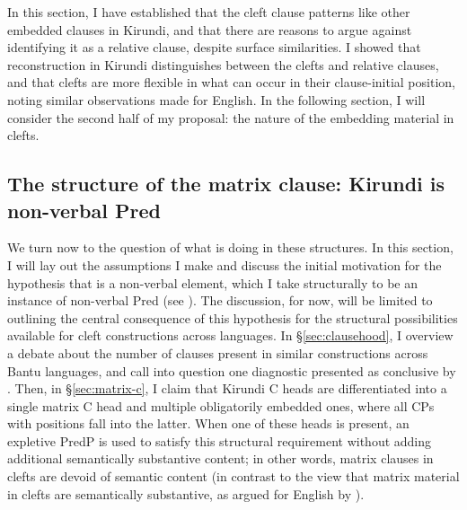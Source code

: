 \documentclass[12pt]{article}
\begin{document}
In this section, I have established that the cleft clause patterns like other embedded clauses in Kirundi, and that there are reasons to argue against identifying it as a relative clause, despite surface similarities. I showed that reconstruction in Kirundi distinguishes between the clefts and relative clauses, and that clefts are more flexible in what can occur in their clause-initial position, noting similar observations made for English. In the following section, I will consider the second half of my proposal: the nature of the embedding material in clefts. 


\subsection{The structure of the matrix clause: Kirundi  is non-verbal Pred} \label{sec:ni-is-pred}

We turn now to the question of what  is doing in these structures. In this section, I will lay out the assumptions I make and discuss the initial motivation for the hypothesis that  is a non-verbal element, which I take structurally to be an instance of non-verbal Pred (see \citealt{adger-ramchand-2003}). The discussion, for now, will be limited to outlining the central consequence of this hypothesis for the structural possibilities available for cleft constructions across languages. In \S\ref{sec:clausehood}, I overview a debate about the number of clauses present in similar constructions across Bantu languages, and call into question one diagnostic presented as conclusive by \citet{zentz-2016ho,zentz-2016}. Then, in \S\ref{sec:matrix-c}, I claim that Kirundi C heads are differentiated into a single matrix C head and multiple obligatorily embedded ones, where all CPs with \abar{} positions fall into the latter. When one of these heads is present, an expletive PredP is used to satisfy this structural requirement without adding additional semantically substantive content; in other words, matrix clauses in clefts are devoid of semantic content (in contrast to the view that matrix material in clefts are semantically substantive, as argued for English by \citealt{hedberg-2000}).
\end{document}
